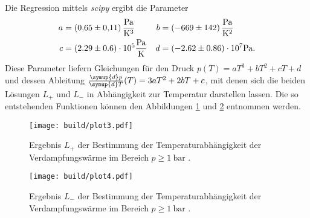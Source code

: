 Die Regression mittels \textit{scipy} \cite{scipy} ergibt die Parameter
\begin{align*}
    a &= \qty{0.65 +- 0.11}{\pascal\per\cubic\kelvin} & b &= \qty{-669 +- 142}{\pascal\per\kelvin\squared} \\
    c &= (2.29 \pm 0.6) \cdot 10^5 \unit{\pascal\per\kelvin}     & d &= (-2.62 \pm 0.86) \cdot 10^7 \unit{\pascal}. \\ 
\end{align*}
Diese Parameter liefern Gleichungen für den Druck $p(T) = aT^3 + bT^2 + cT + d$ und dessen Ableitung $\frac{\symup{d}p}{\symup{d}T}(T) = 3aT^2 + 2bT + c$, mit denen 
sich die beiden Lösungen $L_+$ und $L_-$ in Abhängigkeit zur Temperatur darstellen lassen. Die so entstehenden Funktionen können den Abbildungen \ref{fig:plot3} und 
\ref{fig:plot4} entnommen werden.

\begin{figure}
    \centering
    \texttt{[image: build/plot3.pdf]}
    \caption{Ergebnis $L_+$ der Bestimmung der Temperaturabhängigkeit der Verdampfungswärme im Bereich $p \geq \qty{1}{\bar}$ \cite{matplotlib}.}
    \label{fig:plot3}
\end{figure}

\begin{figure}
    \centering
    \texttt{[image: build/plot4.pdf]}
    \caption{Ergebnis $L_-$ der Bestimmung der Temperaturabhängigkeit der Verdampfungswärme im Bereich $p \geq \qty{1}{\bar}$ \cite{matplotlib}.}
    \label{fig:plot4}
\end{figure}
